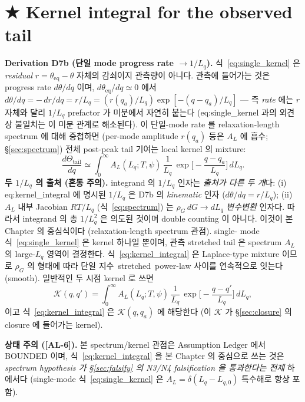\documentclass[11pt,a4paper]{article}
\newcommand{\eq}{\mathrm{eq}}
\newcommand{\AL}[1]{\textsf{[AL-#1]}}
\begin{document}
\section{★ Kernel integral for the observed tail}\label{sec:kernel}
\textbf{Derivation D7b (단일 mode progress rate $\to1/L_q$).} 식~\eqref{eq:single_kernel} 은
\emph{residual} $r=\theta_\eq-\theta$ 자체의 감쇠이지 관측량이 아니다. 관측에 들어가는 것은
progress rate $d\theta/dq$ 이며, $d\theta_\eq/dq\simeq0$ 에서
$d\theta/dq=-\,dr/dq=r/L_q=(r(q_a)/L_q)\exp[-(q-q_a)/L_q]$ — 즉 \emph{rate} 에는 $r$ 자체와 달리
$1/L_q$ prefactor 가 미분에서 자연히 붙는다 (eq:single\_kernel 과의 외견상 불일치는 이 미분
관계로 해소된다). 이 단일-mode rate 를 relaxation-length spectrum 에 대해 중첩하면 (per-mode
amplitude $r(q_a)$ 등은 $A_L$ 에 흡수; \S\ref{sec:spectrum}) 전체 post-peak tail 기여는
local kernel 의 mixture:
\begin{equation}
\boxed{\;\frac{d\Theta_\mathrm{tail}}{dq}\simeq\int_0^\infty A_L(L_q;T,\psi)\,\frac1{L_q}\,
\exp\!\Big[-\frac{q-q_a}{L_q}\Big]\,dL_q.\;}
\label{eq:kernel_integral}
\end{equation}
\textbf{두 $1/L_q$ 의 출처 (혼동 주의).} integrand 의 $1/L_q$ 인자는 \emph{출처가 다른 두 개}다:
(i) eq:kernel\_integral 에 명시된 $1/L_q$ 은 D7b 의 \emph{kinematic} 인자 ($d\theta/dq=r/L_q$);
(ii) $A_L$ 내부 Jacobian $RT/L_q$ (식~\eqref{eq:spectrum}) 는 $\rho_G\,dG\to dL_q$ \emph{변수변환}
인자다. 따라서 integrand 의 총 $1/L_q^2$ 은 의도된 것이며 double counting 이 아니다.
이것이 본 Chapter 의 중심식이다 (relaxation-length spectrum 관점). single-
mode 식~\eqref{eq:single_kernel} 은 kernel 하나일 뿐이며, 관측 stretched tail 은 spectrum
$A_L$ 의 large-$L_q$ 영역이 결정한다. 식~\eqref{eq:kernel_integral} 은 Laplace-type mixture
이므로 $\rho_G$ 의 형태에 따라 단일 지수~stretched~power-law 사이를 연속적으로 잇는다
(smooth). 일반적인 두 시점 kernel 로 쓰면
\begin{equation}
\mathcal K(q,q')=\int_0^\infty A_L(L_q;T,\psi)\,\frac1{L_q}\,\exp\!\Big[-\frac{q-q'}{L_q}\Big]\,dL_q,
\label{eq:K_def}
\end{equation}
이고 식~\eqref{eq:kernel_integral} 은 $\mathcal K(q,q_a)$ 에 해당한다 (이 $\mathcal K$ 가
\S\ref{sec:closure} 의 closure 에 들어가는 kernel).

\textbf{상태 주의 (\AL{6}).} 본 spectrum/kernel 관점은 Assumption Ledger 에서 BOUNDED
이며, 식~\eqref{eq:kernel_integral} 을 본 Chapter 의 중심으로 쓰는 것은 \emph{spectrum
hypothesis 가 \S\ref{sec:falsify} 의 N3/N4 falsification 을 통과한다는 전제} 하에서다
(single-mode 식~\eqref{eq:single_kernel} 은 $A_L=\delta(L_q-L_{q,0})$ 특수해로 항상 포함).
\end{document}
